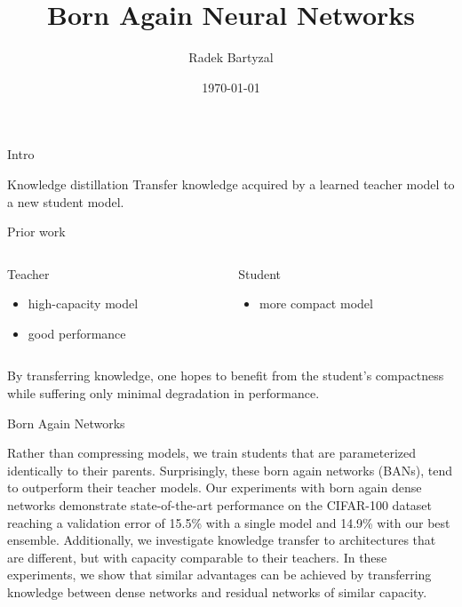 \documentclass{beamer}
\begin{document}
\title{Born Again Neural Networks}  
\author{Radek Bartyzal}
\date{\today} 

\frame{\titlepage} 

\begin{frame}{Intro}

\begin{block}{Knowledge distillation}
Transfer knowledge acquired by a learned
teacher model to a new student model.
\end{block}

\end{frame}

\begin{frame}[t]{Prior work}

\begin{columns}[t]
\begin{column}{0.5\textwidth}
Teacher
\begin{itemize}
\item high-capacity model
\item good performance
\end{itemize}
\end{column}

\begin{column}{0.5\textwidth}
Student
\begin{itemize}
\item more compact model
\end{itemize}
\end{column}

\end{columns}

\vfill
By transferring knowledge, one hopes to benefit from the student’s
compactness while suffering only minimal degradation in performance.

\end{frame}

\begin{frame}{Born Again Networks}


 Rather than
compressing models, we train students that are parameterized identically to their
parents. Surprisingly, these born again networks (BANs), tend to outperform their
teacher models. Our experiments with born again dense networks demonstrate
state-of-the-art performance on the CIFAR-100 dataset reaching a validation error
of 15.5\% with a single model and 14.9\% with our best ensemble. Additionally, we
investigate knowledge transfer to architectures that are different, but with capacity
comparable to their teachers. In these experiments, we show that similar advantages
can be achieved by transferring knowledge between dense networks and residual
networks of similar capacity.

\end{frame}
\end{document}
